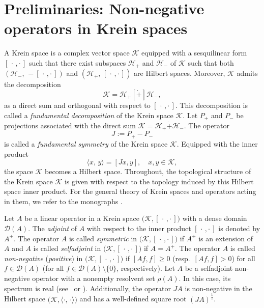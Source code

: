 \documentclass{article}
\numberwithin{equation}{section}
\theoremstyle{definition}
\newcommand{\kip}{[\,\cdot\, , \cdot\,]}
\newcommand{\cK}{{\mathcal K}}
\newcommand{\cH}{{\mathcal H}}
\newcommand{\mD}{\mathcal{D}}
\newcommand{\scalar}[2]{\langle#1,\, #2\rangle}
\newcommand{\define}[1]{\textit{#1}}
\begin{document}
\section{Preliminaries: Non-negative operators in Krein spaces}
\label{sec:interval}

\noindent
A Krein space is a complex vector space $\cK$ equipped with a sesquilinear form $\kip$ such that there exist subspaces $\cH_+$ and $\cH_-$ of $\cK$  such that both $(\cH_-,\, -\kip)$ and $(\cH_+,\, \kip)$ are Hilbert spaces. 
    Moreover, $\cK$ admits the decomposition
\begin{equation}
\label{Bitterfeld}
	\cK = \cH_+[\dot{+}]   \cH_-,
\end{equation}
as a direct sum and orthogonal with respect to $\kip$. This decomposition is called a \define{fundamental decomposition} of the Krein space $\cK$. Let $P_+$ and $P_-$ be projections associated with the direct sum $\cK = \cH_+ \dot{+} \cH_-$. The operator 
\begin{equation*}
	J := P_+ - P_-
\end{equation*}
is called a \define{fundamental symmetry} of the Krein space $\cK$.  Equipped with the inner product  
\begin{equation}
\label{Halle}
	\scalar{x}{y} = [Jx,y], \quad  x,y \in \cK,
\end{equation}
the space $\cK$ becomes a Hilbert space.  Throughout, the topological structure of the Krein space $\cK$ is given with respect to the topology induced by this Hilbert space inner product. For the general theory of Krein spaces and operators acting in them, we refer to the monographs \cite{AI, B74, G24}.

Let  $A$ be a linear operator in a Krein space $\bigl(\cK,\kip\bigr)$ with a dense domain $\mD(A)$. The {\em adjoint} of $A$ with respect to the inner product $\kip$ is denoted by $A^+$. The operator $A$ is called {\em symmetric} in $\bigl(\cK,\kip\bigr)$ if $A^+$ is an extension of $A$ and $A$ is called {\em selfadjoint} in $\bigl(\cK,\kip\bigr)$ if $A = A^+$.  The operator $A$ is called {\em non-negative}  ({\em positive}) in $\bigl(\cK,\kip\bigr)$ if $[Af,f]\ge 0$
(resp.\ $[Af,f]>0$)
for all $f\in\mD(A)$ (for all $f\in\mD(A)\setminus \{0\}$, respectively). Let $A$ be a selfadjoint  non-negative operator with a nonempty resolvent set $\rho(A)$. In this case, its spectrum is real (see~\cite{Ando} or \cite[Theorem~II.3.1]{La}). Additionally, the operator $JA$ is non-negative in the Hilbert space $\bigl(\cK,\scalar{\cdot}{\cdot}\bigr)$ and has a well-defined square root $(JA)^{\frac{1}{2}}$.
\end{document}
